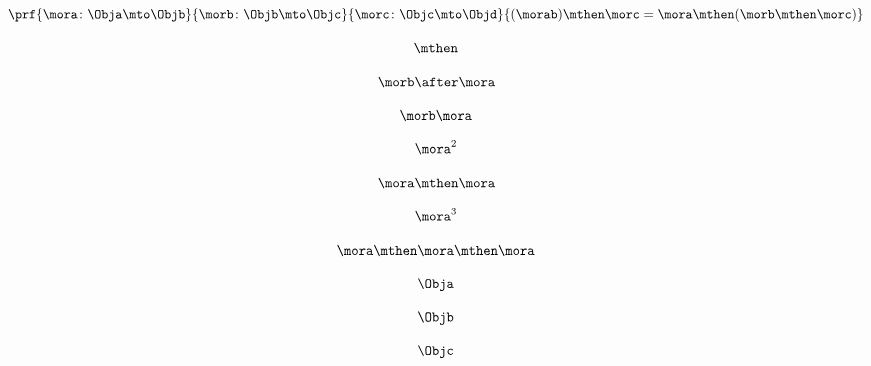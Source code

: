 \begin{forslides}
         \begin{equation}
            \label{eq:63}
            \prf{
        \mora \colon \Obja \mto \Objb
    }{
        \morb\colon \Objb \mto \Objc
    }{
        \morc \colon \Objc \mto \Objd
    }{
        (\morab ) \mthen \morc = \mora \mthen ( \morb  \mthen \morc )
    }
        \end{equation}
        
         \begin{equation}
            \label{eq:64}
            \mthen
        \end{equation}
        
         \begin{equation}
            \label{eq:65}
            \morb\after \mora
        \end{equation}
        
        
         \begin{equation}
            \label{eq:66}
            \morb \mora
        \end{equation}
        
        
         \begin{equation}
            \label{eq:67}
            \mora^2
        \end{equation}
        
        
         \begin{equation}
            \label{eq:68}
            \mora \mthen \mora
        \end{equation}
        
        
         \begin{equation}
            \label{eq:69}
            \mora^3
        \end{equation}
        
        
         \begin{equation}
            \label{eq:70}
            \mora \mthen \mora \mthen \mora
        \end{equation}
        
        
         \begin{equation}
            \label{eq:71}
            \Obja
        \end{equation}
        
        
         \begin{equation}
            \label{eq:72}
            \Objb
        \end{equation}
        
        
         \begin{equation}
            \label{eq:73}
            \Objc
        \end{equation}
        

\end{forslides}
